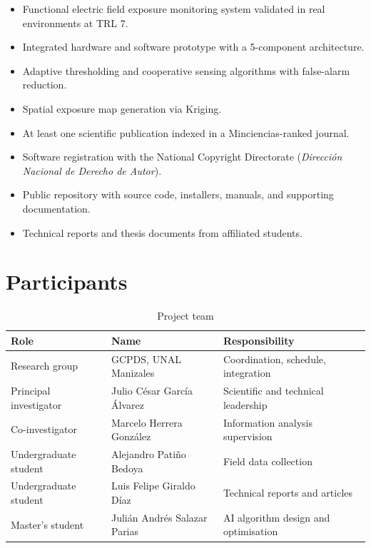 \documentclass[12pt,a4paper]{article}
\begin{document}
\begin{itemize}
  \item Functional electric field exposure monitoring system validated in real environments at TRL 7.
  \item Integrated hardware and software prototype with a 5-component architecture.
  \item Adaptive thresholding and cooperative sensing algorithms with false-alarm reduction.
  \item Spatial exposure map generation via Kriging.
  \item At least one scientific publication indexed in a Minciencias-ranked journal.
  \item Software registration with the National Copyright Directorate (\textit{Dirección Nacional de Derecho de Autor}).
  \item Public repository with source code, installers, manuals, and supporting documentation.
  \item Technical reports and thesis documents from affiliated students.
\end{itemize}

\section{Participants}

\begin{table}[H]
\centering
\caption{Project team}
\begin{tabular}{@{}lll@{}}
\toprule
\textbf{Role} & \textbf{Name} & \textbf{Responsibility} \\
\midrule
Research group & GCPDS, UNAL Manizales & Coordination, schedule, integration \\
Principal investigator & Julio César García Álvarez & Scientific and technical leadership \\
Co-investigator & Marcelo Herrera González & Information analysis supervision \\
Undergraduate student & Alejandro Patiño Bedoya & Field data collection \\
Undergraduate student & Luis Felipe Giraldo Díaz & Technical reports and articles \\
Master's student & Julián Andrés Salazar Parias & AI algorithm design and optimisation \\
\bottomrule
\end{tabular}
\end{table}
\end{document}
